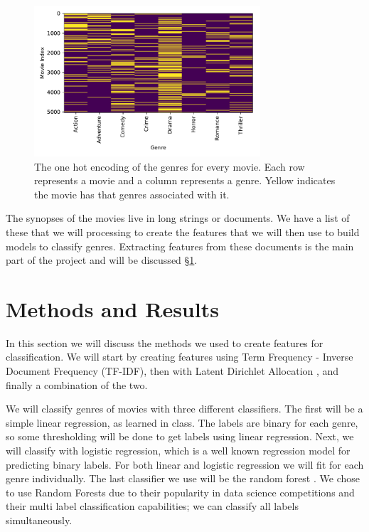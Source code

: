 \documentclass[11pt]{article}
\begin{document}
\begin{figure}[ht]
	\centering
		\includegraphics[width=0.75\textwidth]{one_hot_genres.pdf}
	\caption{The one hot encoding of the genres for every movie. Each row represents a movie and a column represents a genre. Yellow indicates the movie has that genres associated with it.}
	\label{fig:one_hot}
\end{figure}

The synopses of the movies live in long strings or documents. We have a list of these that we will processing to create the features that we will then use to build models to classify genres. Extracting features from these documents is the main part of the project and will be discussed \S \ref{sec:methods}.

\section{Methods and Results}
\label{sec:methods}

In this section we will discuss the methods we used to create features for classification. We will start by creating features using Term Frequency - Inverse Document Frequency (TF-IDF), then with Latent Dirichlet Allocation \cite{blei2003}, and finally a combination of the two. 

We will classify genres of movies with three different classifiers. The first will be a simple linear regression, as learned in class. The labels are binary for each genre, so some thresholding will be done to get labels using linear regression. Next, we will classify with logistic regression, which is a well known regression model for predicting binary labels. For both linear and logistic regression we will fit for each genre individually. The last classifier we use will be the random forest \cite{breiman2001}. We chose to use Random Forests due to their popularity in data science competitions and their multi label classification capabilities; we can classify all labels simultaneously. 
\end{document}
